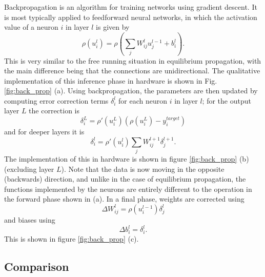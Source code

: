 \documentclass[utf8]{frontiersSCNS}
\begin{document}
\begin{appendices}
Backpropagation is an algorithm for training networks using gradient descent. It is 
most typically applied to feedforward neural networks, in which the activation value of a neuron 
$i$ in layer $l$ is given by $$\rho(u_i^l)=\rho(\sum_jW_{ij}^lu_j^{l-1}+b_i^l).$$ This
is very similar to the free running situation in equilibrium propagation, with the main difference 
being that the connections are unidirectional. The qualitative implementation of this inference
phase in hardware is shown in Fig. \ref{fig:back_prop} (a). Using backpropagation, the 
parameters are then updated by computing error
correction terms $\delta_i^l$ for each neuron $i$ in layer $l$; for the output layer $L$ the 
correction is $$\delta_i^L=\rho'(u_i^L)(\rho(u_i^L)-y_i^{target})$$ and for deeper layers it is
$$\delta_i^l=\rho'(u_i^l)\sum_jW_{ij}^{l+1}\delta_j^{l+1}.$$ The implementation of 
this in hardware is shown in figure \ref{fig:back_prop} (b) (excluding layer $L$). Note that the data
is now moving in the opposite (backwards) direction, and unlike in the case of equilibrium 
propagation, the functions implemented by the neurons are entirely different to the operation in 
the forward phase shown in (a). In a final phase, weights are corrected using $$\Delta 
W_{ij}^l=\rho(u_i^{l-1})\delta_j^l$$ and biases using 
$$\Delta b_i^l=\delta_i^l.$$ This is shown in figure \ref{fig:back_prop} (c).


\subsection{Comparison}


\end{appendices}
\end{document}

